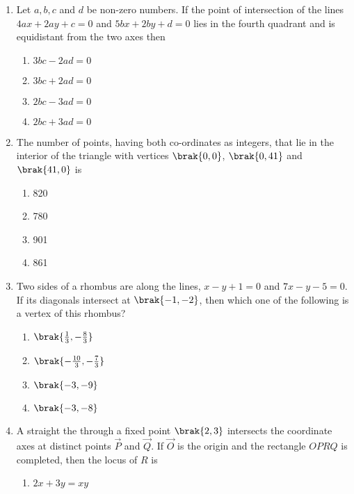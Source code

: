 \begin{enumerate}[label=\thesubsection.\arabic*.,ref=\thesubsection.\theenumi]
\item Let $a, b, c$ and $d$ be non-zero numbers. If the point of intersection of the lines $4ax+2ay+c=0$ and $5bx+2by+d=0$ lies in the fourth quadrant and is equidistant from the two axes then \hfill {}
\begin{multicols}{2}
\begin{enumerate}
\item $3bc-2ad= 0$
\item $3bc+2ad=0$
\item $2bc-3ad= 0$
\item $2bc+3ad=0$ 
\end{enumerate}
\end{multicols}
%
\item The number of points, having both co-ordinates as integers, 
that lie in the interior of the triangle with vertices $\brak{0, 0}$,  $\brak{0,41}$ and $\brak{41, 0}$ is 
\hfill {}
\begin{multicols}{4}
\begin{enumerate}
\item 820
\item 780
\item 901
\item 861
\end{enumerate}
\end{multicols}
%
\item Two sides of a rhombus are along the lines, $x-y+1=0$ and 
$7x-y-5=0$. If its diagonals intersect at $\brak{-1, -2}$, then which one of the following is a vertex of this rhombus?
%
\hfill{}
\begin{multicols}{4}
\begin{enumerate}
\item $\brak{\frac{1}{3}, -\frac{8}{3}}$
\item $\brak{-\frac{10}{3}, -\frac{7}{3}}$
\item $\brak{-3, -9}$
\item $\brak{-3, -8}$
\end{enumerate}
\end{multicols}
%
\item A straight the through a fixed point $\brak{2, 3}$ intersects the 
	coordinate axes at distinct points $\vec{P}$ and $\vec{Q}$. If $\vec{O}$ is the origin 
and the rectangle $OPRQ$ is completed, then the locus of $R$ is
%
\hfill {}
\begin{multicols}{2}
\begin{enumerate}
\item $2x+3y = xy$

\end{enumerate}
\end{multicols}
\end{enumerate}
